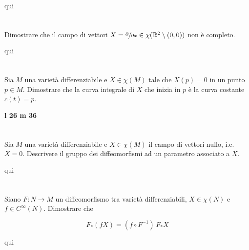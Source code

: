 qui

\tocless\section{}\label{es2-31}

\begin{tcolorbox}
	Dimostrare che il campo di vettori $ X = \sfrac{\partial}{\partial x} \in \chi(\mathbb{R}^{2} \setminus (0,0)) $ non è completo.
\end{tcolorbox}

qui

\tocless\section{}\label{es2-32}

\begin{tcolorbox}
	Sia $ M $ una varietà differenziabile e $ X \in \chi(M) $ tale che $ X(p) = 0 $ in un punto $ p \in M $. Dimostrare che la curva integrale di $ X $ che inizia in $ p $ è la curva costante $ c(t)=p $.
\end{tcolorbox}

\textbf{l 26 m 36}

\tocless\section{}\label{es2-33}

\begin{tcolorbox}
	Sia $ M $ una varietà differenziabile e $ X \in \chi(M) $ il campo di vettori nullo, i.e. $ X = 0 $. Descrivere il gruppo dei diffeomorfismi ad un parametro associato a $ X $.
\end{tcolorbox}

qui

\tocless\section{}\label{es2-34}

\begin{tcolorbox}
	Siano $ F : N \to M $ un diffeomorfismo tra varietà differenziabili, $ X \in \chi(N) $ e $ f \in C^{\infty}(N) $. Dimostrare che
	
	\begin{equation}
		F_{*}(f X) = (f \circ F^{-1}) \, F_{*} X
	\end{equation}
\end{tcolorbox}

qui

